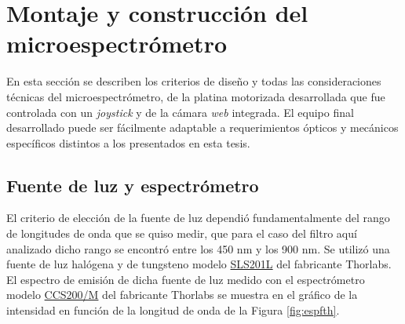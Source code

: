 \singlespacing
\section{Montaje y construcción del microespectrómetro}
\label{sec:montcontmsp}

\hspace{0.5cm}En esta sección se describen los criterios de diseño y todas las consideraciones técnicas del microespectrómetro, de la platina motorizada desarrollada que fue controlada con un \textit{joystick} y de la cámara \textit{web} integrada. El equipo final desarrollado puede ser fácilmente adaptable a requerimientos ópticos y mecánicos específicos distintos a los presentados en esta tesis.

\singlespacing
\subsection{Fuente de luz y espectrómetro \href{https://github.com/jrr1984/defects_analysis/blob/master/light_sources_spectrum.py}{\faGithub}}
\label{sec:fteluzyesp}

\hspace{0.5cm}El criterio de elección de la fuente de luz dependió fundamentalmente del rango de longitudes de onda que se quiso medir, que para el caso del filtro aquí analizado dicho rango se encontró entre los 450 nm y los 900 nm.
Se utilizó una fuente de luz halógena y de tungsteno modelo \href{https://www.thorlabs.com/newgrouppage9.cfm?objectgroup_id=7269&pn=SLS201L/M}{SLS201L} del fabricante Thorlabs. El espectro de emisión de dicha fuente de luz medido con el espectrómetro modelo \href{https://www.thorlabs.com/thorproduct.cfm?partnumber=CCS200/M#ad-image-0}{CCS200/M} del fabricante Thorlabs se muestra en el gráfico de la intensidad en función de la longitud de onda de la Figura \ref{fig:espfth}.

